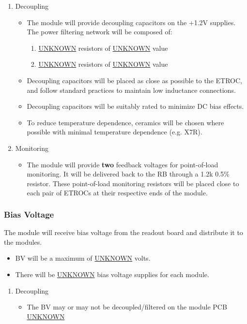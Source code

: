 \documentclass[11pt]{article}
\begin{document}
\begin{enumerate}
\item Decoupling
\label{sec:org3c59432}
\begin{itemize}
\item The module will provide decoupling capacitors on the +1.2V supplies. The power filtering network will be composed of:
\begin{enumerate}
\item \uline{UNKNOWN} resistors of \uline{UNKNOWN} value
\item \uline{UNKNOWN} resistors of \uline{UNKNOWN} value
\end{enumerate}
\item Decoupling capacitors will be placed as close as possible to the ETROC, and follow standard practices to maintain low inductance connections.
\item Decoupling capacitors will be suitably rated to minimize DC bias effects.
\item To reduce temperature dependence, ceramics will be chosen where possible with minimal temperature dependence (e.g. X7R).
\end{itemize}
\item Monitoring
\label{sec:org4c7fdc1}
\begin{itemize}
\item The module will provide \textbf{two} feedback voltages for point-of-load monitoring. It will be delivered back to the RB through a 1.2k 0.5\% resistor. These point-of-load monitoring resistors will be placed close to each pair of ETROCs at their respective ends of the module.
\end{itemize}
\end{enumerate}
\subsubsection{Bias Voltage}
\label{sec:org2a58f71}

The module will receive bias voltage from the readout board and distribute it to the modules.

\begin{itemize}
\item BV will be a maximum of \uline{UNKNOWN} volts.
\item There will be \uline{UNKNOWN} bias voltage supplies for each module.
\end{itemize}
\begin{enumerate}
\item Decoupling
\label{sec:org595b90e}
\begin{itemize}
\item The BV may or may not be decoupled/filtered on the module PCB \uline{UNKNOWN}
\end{itemize}
\end{enumerate}
\end{document}
